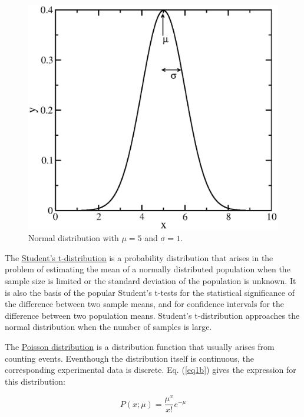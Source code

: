 \documentclass[byrevtex,amssymb,aps,pra,floatfix,letterpaper]{revtex4}
\begin{document}
\begin{figure}[!htp]
\vspace{0.5cm}
\begin{center}
\includegraphics[scale=0.4]{figgauss}
\caption{Normal distribution with $\mu = 5$ and $\sigma = 1$.}
\label{figgauss}
\end{center}
\end{figure}

The \href{http://en.wikipedia.org/wiki/Student's_t-distribution}{\underline{Student's t-distribution}} is a probability distribution that arises in the problem of estimating the mean of a normally distributed population when the sample size is limited or the standard deviation of the population is unknown. It is also the basis of the popular Student's t-tests for the statistical significance of the difference between two sample means, and for confidence intervals for the difference between two population means. Student's t-distribution approaches the normal distribution when the number of samples is large.

The \href{http://en.wikipedia.org/wiki/Poisson_distribution}{\underline{Poisson distribution}} is a distribution function that usually arises from counting events. Eventhough the distribution itself is continuous, the corresponding experimental data is discrete. Eq. (\ref{eq1b}) gives the expression for this distribution:

\begin{equation}
\label{eq1b}
P(x; \mu) = \frac{\mu^x}{x!}e^{-\mu}
\end{equation}
\end{document}
